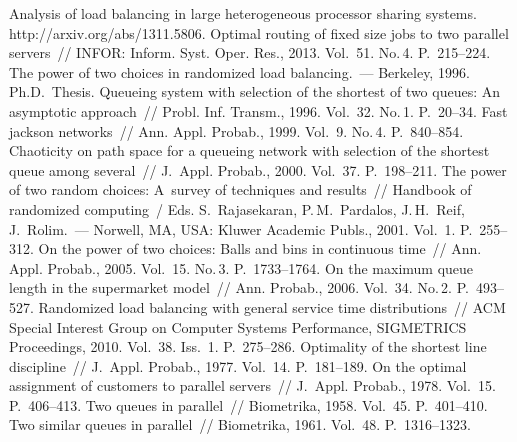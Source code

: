 \begin{multicols}{2}
{\small\frenchspacing
 {%
 \begin{thebibliography}{99}
     Analysis of load balancing in large 
heterogeneous processor sharing systems. {\sf http://arxiv.org/abs/1311.5806}.
     Optimal routing of fixed size jobs to two parallel 
servers~// INFOR: Inform. Syst. Oper. Res., 2013. Vol.~51. No.\,4. 
P.~215--224.
     The power of two choices in randomized load balancing.~--- Berkeley, 1996.
    Ph.D.\  Thesis.
     Queueing system with 
selection of the shortest of two queues: An asymptotic approach~// Probl. Inf. Transm., 1996. 
Vol.~32. No.\,1. P.~20--34.
     Fast jackson networks~// Ann. Appl. Probab., 1999. Vol.~9. 
No.\,4. P.~840--854.
     Chaoticity on path space for a queueing network with selection of the 
shortest queue among several~// J.~Appl. Probab., 2000. Vol.~37. P.~198--211.
     The power of two random choices: 
A~survey of techniques and results~// Handbook of randomized computing~/ Eds. 
S.~Rajasekaran, P.\,M.~Pardalos, J.\,H.~Reif, J.~Rolim.~--- Norwell, MA, USA: Kluwer Academic 
Publs., 2001.  Vol.~1. P.~255--312.
     On the power of two choices: Balls and bins in continuous 
time~// Ann. Appl. Probab., 2005. Vol.~15. No.\,3. P.~1733--1764.
     On the maximum queue length in the supermarket model~// 
Ann. Probab., 2006. Vol.~34. No.\,2. P.~493--527.
     Randomized load balancing with general service 
time distributions~// ACM Special Interest Group on Computer Systems Performance, 
SIGMETRICS Proceedings, 2010. Vol.~38. Iss.~1. P.~275--286.
     Optimality of the shortest line discipline~// J.~Appl. Probab., 1977. Vol.~14. 
P.~181--189.
     On the optimal assignment of customers to parallel servers~// J.~Appl. 
Probab., 1978. Vol.~15. P.~406--413.
     Two queues in parallel~// Biometrika, 1958. Vol.~45. P.~401--410.
     Two similar queues in parallel~// Biometrika, 1961. Vol.~48. 
P.~1316--1323.



\end{thebibliography}}}
\end{multicols}
